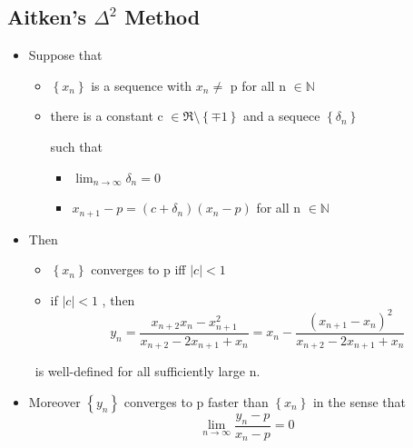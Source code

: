 \documentclass{beamer}
\begin{document}
\subsection{Aitken's $\Delta^2$ Method}
\begin{frame}

\begin{theorem}
\begin{itemize}
\item[] <1-> Suppose that
\begin{itemize}
	\item $\left\{x_{n}\right\}$ is a sequence with $x_{n}\neq$ p for all n $\in \mathbb{N}$ 
	\item there is a constant c $\in \Re\setminus \left\{ \mp 1 \right\}$ and a sequece $\left\{ \delta_{n} \right\}$

		such that 
		\begin{itemize}
			\item $\lim_{n\rightarrow\infty}\delta_{n}=0$
			\item $x_{n+1}-p=(c+\delta_{n})(x_{n}-p)$ for all n $\in  \mathbb{N}$
		\end{itemize}
	\end{itemize}
	\item[] <2->Then
	
	\begin{itemize}
		\item $\left\{x_{n}\right\}$ converges to p iff $\left|c\right|<1$
		\item if $\left|c\right|<1$ , then 
	\[ 
	y_{n}=\frac{x_{n+2}x_{n}-x_{n+1}^2}{x_{n+2} - 2x_{n+1}+x_{n}}= x_n-\frac{(x_{n+1}-x_n)^2}{x_{n+2}-2x_{n+1}+x_n}
	\] 
		\end{itemize}
		\      is well-defined for all sufficiently large n.
		\item[]<3-> Moreover $\left\{y_{n}\right\}$ converges to p faster than $\left\{x_{n}\right\}$ in the sense that
		\[ 
		\lim_{n\rightarrow\infty} \frac{y_{n}-p}{x_{n}-p}=0
		\]
 \end{itemize}

\end{theorem}

\vskip 1cm

\end{frame}
\end{document}
